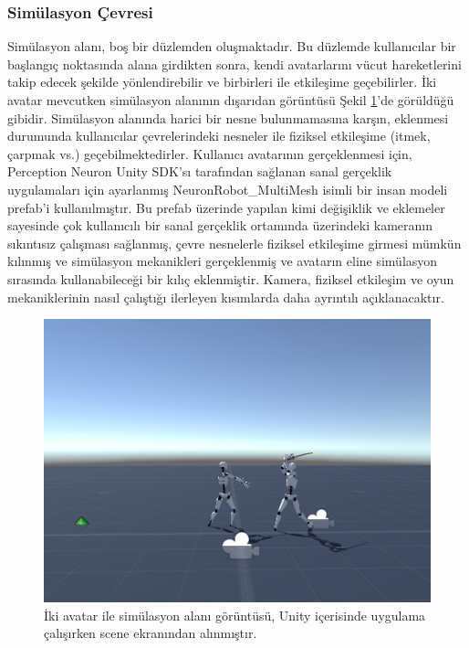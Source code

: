 \documentclass[a4paper, 12pt, titlepage]{article}
\begin{document}
\subsubsection{Simülasyon Çevresi}

Simülasyon alanı, boş bir düzlemden oluşmaktadır. Bu düzlemde kullanıcılar bir başlangıç noktasında
alana girdikten sonra, kendi avatarlarını vücut hareketlerini takip edecek şekilde yönlendirebilir
ve birbirleri ile etkileşime geçebilirler. İki avatar mevcutken simülasyon alanının dışarıdan
görüntüsü Şekil \ref{env}’de görüldüğü gibidir. Simülasyon alanında harici bir nesne bulunmamasına
karşın, eklenmesi durumunda kullanıcılar çevrelerindeki nesneler ile fiziksel etkileşime (itmek,
çarpmak vs.) geçebilmektedirler. Kullanıcı avatarının gerçeklenmesi için, Perception Neuron Unity
SDK’sı tarafından sağlanan sanal gerçeklik uygulamaları için ayarlanmış NeuronRobot\_MultiMesh isimli
bir insan modeli prefab’i kullanılmıştır. Bu prefab üzerinde yapılan kimi değişiklik ve eklemeler
sayesinde çok kullanıcılı bir sanal gerçeklik ortamında üzerindeki kameranın sıkıntısız çalışması
sağlanmış, çevre nesnelerle fiziksel etkileşime girmesi mümkün kılınmış ve simülasyon mekanikleri
gerçeklenmiş ve avatarın eline simülasyon sırasında kullanabileceği bir kılıç eklenmiştir. Kamera,
fiziksel etkileşim ve oyun mekaniklerinin nasıl çalıştığı ilerleyen kısımlarda daha ayrıntılı
açıklanacaktır.

\begin{figure}[ht!]
    \centering
        \includegraphics[width=6in]{images/env2}
    \caption{İki avatar ile simülasyon alanı görüntüsü, Unity içerisinde uygulama çalışırken scene
             ekranından alınmıştır.}
    \label{env}
\end{figure}
\end{document}
